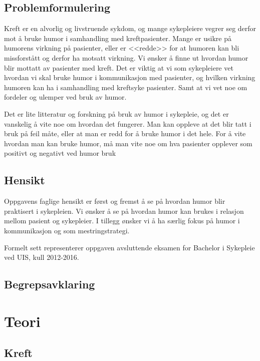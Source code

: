 \section{Problemformulering}

Kreft er en alvorlig og livstruende sykdom, og mange sykepleiere vegrer seg
derfor mot å bruke humor i samhandling med kreftpasienter. Mange er usikre på
humorens virkning på pasienter, eller er <<redde>> for at humoren kan bli
missforstått og derfor ha motsatt virkning. Vi ønsker å finne ut hvordan humor
blir mottatt av pasienter med kreft. Det er viktig at vi som sykepleiere vet
hvordan vi skal bruke humor i kommunikasjon med pasienter, og hvilken virkning
humoren kan ha i samhandling med kreftsyke pasienter. Samt at vi vet noe om
fordeler og ulemper ved bruk av humor.

Det er lite litteratur og forskning på bruk av humor i sykepleie, og det er
vanskelig å vite noe om hvordan det fungerer. Man kan oppleve at det blir tatt
i bruk på feil måte, eller at man er redd for å bruke humor i det hele. For å
vite hvordan man kan bruke humor, må man vite noe om hva pasienter opplever som
positivt og negativt ved humor bruk

\section{Hensikt}

Oppgavens faglige hensikt er først og fremst å se på hvordan humor blir
praktisert i sykepleien. Vi ønsker å se på hvordan humor kan brukes i relasjon
mellom pasient og sykepleier. I tillegg ønsker vi å ha særlig fokus på humor i
kommunikasjon og som mestringstrategi.

Formelt sett representerer oppgaven avsluttende eksamen for Bachelor i
Sykepleie ved UIS, kull 2012-2016.

\section{Begrepsavklaring}

\chapter{Teori}
\section{Kreft}

